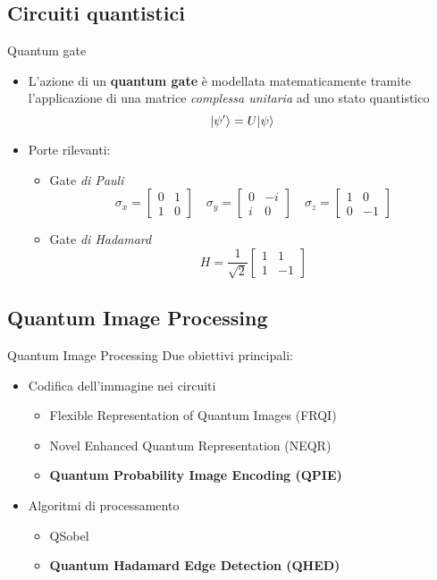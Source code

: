 \subsection{Circuiti quantistici}

\begin{frame}{Quantum gate}
	\begin{itemize}
		\item L'azione di un \textbf{quantum gate} è modellata matematicamente
		tramite l'applicazione di una matrice \emph{complessa unitaria} ad uno
		stato quantistico
		\[
		\lvert\psi'\rangle = U\lvert\psi\rangle
		\]
		\pause
		\item Porte rilevanti:
		\begin{itemize}
			\item Gate \emph{di Pauli}
			\[
			\sigma_x = 
			\begin{bmatrix}
				0 & 1 \\
				1 & 0
			\end{bmatrix}
			\quad
			\sigma_y = 
			\begin{bmatrix}
				0 & -i \\
				i & 0
			\end{bmatrix}
			\quad
			\sigma_z = 
			\begin{bmatrix}
				1 & 0 \\
				0 & -1
			\end{bmatrix}
			\]
			\item Gate \emph{di Hadamard}
			\[
			H = \frac{1}{\sqrt{2}}
			\begin{bmatrix}
				1 & 1 \\
				1 & -1
			\end{bmatrix}
			\]
		\end{itemize}
	\end{itemize}
\end{frame}

\subsection{Quantum Image Processing}

\begin{frame}{Quantum Image Processing}
	Due obiettivi principali:
	\begin{itemize}
		\item<1-> Codifica dell'immagine nei circuiti
		\begin{itemize}
			\item Flexible Representation of Quantum Images (FRQI) \cite{Le2011}
			\item Novel Enhanced Quantum Representation (NEQR) \cite{Zhang2013}
			\item \textbf{Quantum Probability Image Encoding (QPIE)} \cite{Yao2018}
		\end{itemize}
		\item<2-> Algoritmi di processamento
		\begin{itemize}
			\item QSobel \cite{Zhang2014}
			\item \textbf{Quantum Hadamard Edge Detection (QHED)} \cite{Yao2018}
		\end{itemize}
	\end{itemize}
\end{frame}

